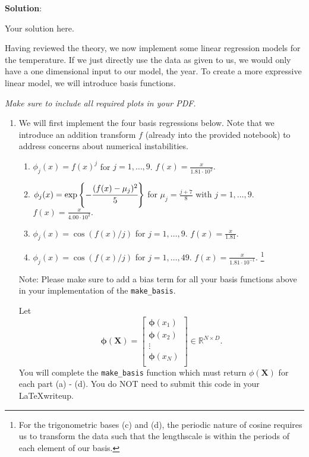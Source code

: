 \documentclass[submit]{../harvardml}
\newenvironment{solution}{
    \vspace{2mm}
    \color{blue}\noindent\textbf{Solution}:
}{}
\begin{document}
\newpage
\begin{solution}
	Your solution here.
\end{solution}


\begin{problem}

 Having reviewed the theory, we now implement some linear regression models for the temperature. If we just directly use the data as given to us, we would only have
    a one dimensional input to our model, the year.  To create a more expressive linear
    model, we will introduce basis functions.

\vspace{1em}

\noindent\emph{Make sure to include all required plots in your PDF.}

\begin{enumerate}
  \item
        We will first implement the four basis regressions below. Note that we introduce an addition transform $f$ (already into the provided notebook) to address concerns about numerical instabilities.
        \begin{enumerate}
          \item $\phi_j(x)= f(x)^j$ for $j=1,\ldots, 9$. $f(x) = \frac{x}{1.81 \cdot 10^{2}}.$
          \item $\phi_j(x) = \exp\left\{-\cfrac{(f(x)-\mu_j)^2}{5}\right\}$ for $\mu_j=\frac{j + 7}{8}$ with $j=1,\ldots, 9$. $f(x) = \frac{x}{4.00 \cdot 10^{2}}.$
          \item $\phi_j(x) =  \cos(f(x) / j)$ for $j=1, \ldots, 9$. $f(x) = \frac{x}{1.81}$.
          \item $\phi_j(x) = \cos(f(x) / j)$ for $j=1, \ldots, 49$. $f(x) = \frac{x}{1.81 \cdot 10^{-1}}$. \footnote{For the trigonometric bases (c) and (d), the periodic nature of
                  cosine requires us to transform the data such that the
                  lengthscale is within the periods of each element of our basis.}
        \end{enumerate}

        {\footnotesize * Note: Please make sure to add a bias term for
        all your basis functions above in your implementation of the
        \verb|make_basis|.}

        Let
        $$ \mathbf{\phi}(\mathbf{X}) =
          \begin{bmatrix}
            \mathbf{\phi}(x_1) \\
            \mathbf{\phi}(x_2) \\
            \vdots             \\
            \mathbf{\phi}(x_N) \\
          \end{bmatrix} \in \mathbb{R}^{N\times D}.$$
        You will complete the \verb|make_basis| function which must return
        $\phi(\mathbf{X})$ for each part
        (a) - (d). You do NOT need to submit this
        code in your \LaTeX writeup.


\end{enumerate}
\end{problem}
\end{document}
